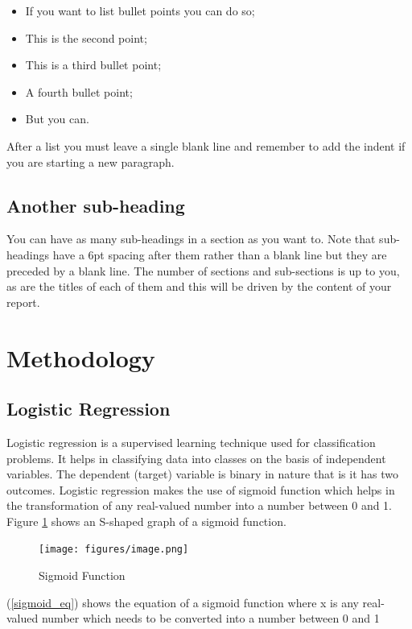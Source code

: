 \documentclass[a4paper,10pt]{article}
\begin{document}
\begin{itemize}
    \item If you want to list bullet points you can do so;
    \item This is the second point;
    \item This is a third bullet point;
    \item A fourth bullet point;
    \item But you can.
\end{itemize}   

After a list you must leave a single blank line and remember to add the indent if you are starting a new paragraph.

\subsection{Another sub-heading}

You can have as many sub-headings in a section as you want to. Note that sub-headings have a 6pt spacing after them rather than a blank line but they are preceded by a blank line. The number of sections and sub-sections is up to you, as are the titles of each of them and this will be driven by the content of your report.

\section{Methodology}

\subsection{Logistic Regression}

Logistic regression is a supervised learning technique used for classification problems. It helps in classifying data into classes on the basis of independent variables. The dependent (target) variable is binary in nature that is it has two outcomes. 
Logistic regression makes the use of sigmoid function which helps in the transformation of any real-valued number into a number between 0 and 1. Figure \ref{sigmoid} shows an S-shaped graph of a sigmoid function. 


\begin{figure}[ht]
\centering
\texttt{[image: figures/image.png]}
\caption{Sigmoid Function}
\label{sigmoid}
\end{figure}

(\ref{sigmoid_eq}) shows the equation of a sigmoid function where x is any real-valued number which needs to be converted into a number between 0 and 1
\end{document}
